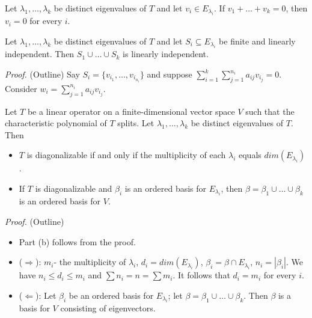 \documentclass[12pt]{article}
\newenvironment{lemma}[2][Lemma]{\begin{trivlist}
\item[\hskip \labelsep {\bfseries #1}\hskip \labelsep {\bfseries #2.}]}{\end{trivlist}}
\newenvironment{theorem}[2][Theorem]{\begin{trivlist}
\item[\hskip \labelsep {\bfseries #1}\hskip \labelsep {\bfseries #2.}]}{\end{trivlist}}
\begin{document}
\begin{lemma}{9}
Let $\lambda_1, \dots, \lambda_k$ be distinct eigenvalues of $T$ and let $v_i \in E_{\lambda_i}$. If $v_1 + \dots + v_k = 0$, then $v_i = 0$ for every $i$.
\end{lemma}

\begin{theorem}{5.8}
Let $\lambda_1, \dots, \lambda_k$ be distinct eigenvalues of $T$ and let $S_i \subseteq E_{\lambda_i}$ be finite and linearly independent. Then $S_1 \cup \dots \cup S_k$ is linearly independent.
\end{theorem}

\textit{Proof.} (Outline)
Say $S_i = \{v_{i_1}, \dots, v_{i_{n_i}}\}$ and suppose $\sum_{i = 1}^k\sum_{j = 1}^{n_i}a_{ij}v_{i_j} = 0$. Consider $w_i = \sum_{j = 1}^{n_i}a_{ij}v_{i_j}$.

\begin{theorem}{5.9}
Let $T$ be a linear operator on a finite-dimensional vector space $V$ such that the characteristic polynomial of $T$ splits. Let $\lambda_1, \dots, \lambda_k$ be distinct eigenvalues of $T$. Then

\begin{itemize}
    \item[(a)] $T$ is diagonalizable if and only if the multiplicity of each $\lambda_i$ equals $dim(E_{\lambda_i})$.
    
    \item[(b)] If $T$ is diagonalizable and $\beta_i$ is an ordered basis for $E_{\lambda_i}$, then $\beta = \beta_1 \cup \dots \cup \beta_k$ is an ordered basis for $V$.
\end{itemize}
\end{theorem}

\textit{Proof.} (Outline)
\begin{itemize}
    \item Part (b) follows from the proof.
    
    \item ($\Longrightarrow$): $m_i$- the multiplicity of $\lambda_i$, $d_i = dim(E_{\lambda_i})$, $\beta_i = \beta \cap E_{\lambda_i}$, $n_i = | \beta_i |$. We have $n_i \leq d_i \leq m_i$ and $\sum n_i = n = \sum m_i$. It follows that $d_i = m_i$ for every $i$.
    
    \item ($\Longleftarrow$): Let $\beta_i$ be an ordered basis for $E_{\lambda_i}$; let $\beta = \beta_1 \cup \dots \cup \beta_k$. Then $\beta$ is a basis for $V$ consisting of eigenvectors.
\end{itemize}
\end{document}
